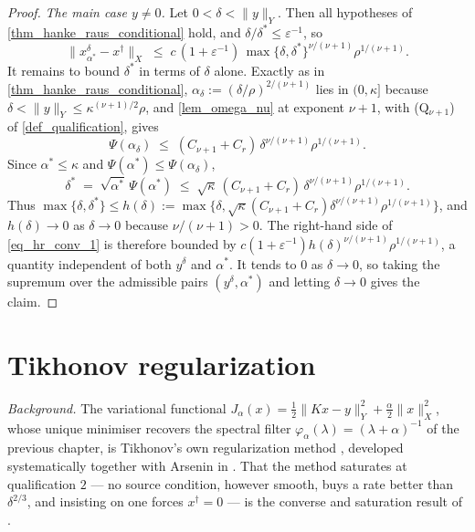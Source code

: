 \documentclass[a4paper]{report}
\theoremstyle{plain}
\theoremstyle{definition}
\theoremstyle{remark}
\newcommand{\dg}{^{\dagger}}
\begin{document}
\begin{proof}
  \emph{The main case $y \ne 0$.}  Let $0 < \delta < \|y\|_Y$.  Then all hypotheses of
  \cref{thm_hanke_raus_conditional} hold, and $\delta/\delta^{*} \le \varepsilon^{-1}$,
  so
  \begin{equation}\label{eq_hr_conv_1}
    \|x^{\delta}_{\alpha^{*}} - x\dg\|_X \;\le\; c\,(1 + \varepsilon^{-1})\,
      \max\{\delta,\delta^{*}\}^{\nu/(\nu+1)}\rho^{1/(\nu+1)} .
  \end{equation}
  It remains to bound $\delta^{*}$ in terms of $\delta$ alone.  Exactly as in
  \cref{thm_hanke_raus_conditional}, $\alpha_{\delta} := (\delta/\rho)^{2/(\nu+1)}$ lies
  in $(0,\kappa]$ because $\delta < \|y\|_Y \le \kappa^{(\nu+1)/2}\rho$, and
  \cref{lem_omega_nu} at exponent $\nu+1$, with (Q$_{\nu+1}$) of
  \cref{def_qualification}, gives
  \[
    \Psi(\alpha_{\delta}) \;\le\;
      (C_{\nu+1} + C_r)\,\delta^{\nu/(\nu+1)}\rho^{1/(\nu+1)} .
  \]
  Since $\alpha^{*} \le \kappa$ and $\Psi(\alpha^{*}) \le \Psi(\alpha_{\delta})$,
  \[
    \delta^{*} \;=\; \sqrt{\alpha^{*}}\,\Psi(\alpha^{*}) \;\le\;
      \sqrt{\kappa}\,(C_{\nu+1} + C_r)\,\delta^{\nu/(\nu+1)}\rho^{1/(\nu+1)} .
  \]
  Thus $\max\{\delta,\delta^{*}\} \le h(\delta) := \max\{\delta,
  \sqrt{\kappa}(C_{\nu+1}+C_r)\delta^{\nu/(\nu+1)}\rho^{1/(\nu+1)}\}$, and $h(\delta) \to
  0$ as $\delta \to 0$ because $\nu/(\nu+1) > 0$.  The right-hand side of
  \eqref{eq_hr_conv_1} is therefore bounded by $c(1+\varepsilon^{-1})
  h(\delta)^{\nu/(\nu+1)}\rho^{1/(\nu+1)}$, a quantity independent of both $y^{\delta}$
  and $\alpha^{*}$.  It tends to $0$ as $\delta \to 0$, so taking the supremum over the
  admissible pairs $(y^{\delta},\alpha^{*})$ and letting $\delta \to 0$ gives the claim.
\end{proof}


\chapter{Tikhonov regularization}
\label{ch_16_tikhonov}

\noindent\emph{Background.} The variational functional
$J_{\alpha}(x) = \tfrac12\|Kx-y\|_Y^{2} + \tfrac{\alpha}{2}\|x\|_X^{2}$, whose unique
minimiser recovers the spectral filter $\varphi_{\alpha}(\lambda) = (\lambda+\alpha)^{-1}$
of the previous chapter, is Tikhonov's own regularization method \citep{Tikhonov1963},
developed systematically together with Arsenin in \citet{TikhonovArsenin1977}. That the
method saturates at qualification $2$ --- no source condition, however smooth, buys a
rate better than $\delta^{2/3}$, and insisting on one forces $x\dg = 0$ --- is the
converse and saturation result of \citet{Neubauer1997}.
\end{document}
